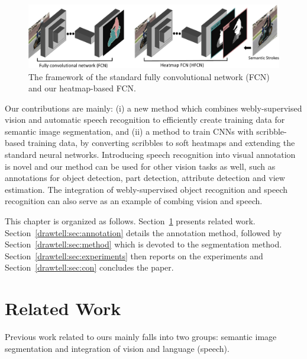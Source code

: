  \begin{figure}[!tb]
\centering
\includegraphics[width=0.95\linewidth]{./draw_and_tell/fig2/figure2-crop.pdf}
\caption{The framework of the standard fully convolutional network
  (FCN)~\citep{Long_2015_CVPR} and our heatmap-based FCN.}
\label{./draw_and_tell/fig:2} \vspace{-3mm}
\end{figure}

Our contributions are mainly: (i) a new method which combines webly-supervised vision and automatic speech recognition to efficiently create training data for semantic image segmentation,
and (ii) a method to train CNNs with scribble-based training data, by converting scribbles to soft heatmaps and extending the standard neural networks. 
Introducing speech recognition into visual annotation is novel and 
our method can be used for other vision tasks as well, such as annotations for object detection, part detection, attribute detection and view estimation. The integration of webly-supervised object recognition and speech recognition can also serve as an example of combing vision and speech. 

This chapter is organized as follows. Section~\ref{drawtell:sec:related} presents
related work. Section~\ref{drawtell:sec:annotation} details the
annotation method, followed by Section~\ref{drawtell:sec:method} which is devoted
to the segmentation method. Section~\ref{drawtell:sec:experiments} then reports on the
experiments and Section~\ref{drawtell:sec:con} concludes the paper.


\section{Related Work}
\label{drawtell:sec:related}

Previous work related to ours mainly falls into two groups:
semantic image segmentation and integration of
vision and language (speech).

